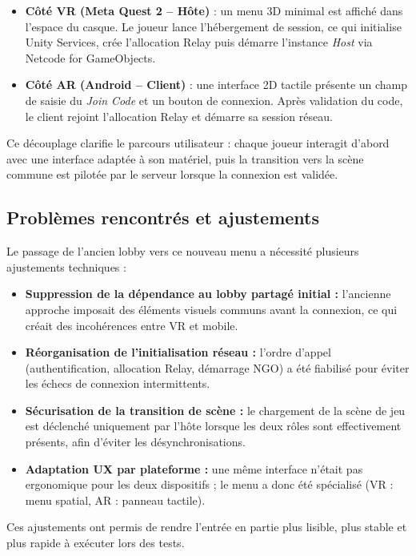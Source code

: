 \documentclass[12pt, a4paper]{article}
\begin{document}
\begin{itemize}
  \item \textbf{Côté VR (Meta Quest 2 -- Hôte)} : un menu 3D minimal est affiché dans l'espace du casque. Le joueur lance l'hébergement de session, ce qui initialise Unity Services, crée l'allocation Relay puis démarre l'instance \textit{Host} via Netcode for GameObjects.
  \item \textbf{Côté AR (Android -- Client)} : une interface 2D tactile présente un champ de saisie du \textit{Join Code} et un bouton de connexion. Après validation du code, le client rejoint l'allocation Relay et démarre sa session réseau.
\end{itemize}

Ce découplage clarifie le parcours utilisateur : chaque joueur interagit d'abord avec une interface adaptée à son matériel, puis la transition vers la scène commune est pilotée par le serveur lorsque la connexion est validée.

\subsection{Problèmes rencontrés et ajustements}

Le passage de l'ancien lobby vers ce nouveau menu a nécessité plusieurs ajustements techniques :

\begin{itemize}
  \item \textbf{Suppression de la dépendance au lobby partagé initial :} l'ancienne approche imposait des éléments visuels communs avant la connexion, ce qui créait des incohérences entre VR et mobile.
  \item \textbf{Réorganisation de l'initialisation réseau :} l'ordre d'appel (authentification, allocation Relay, démarrage NGO) a été fiabilisé pour éviter les échecs de connexion intermittents.
  \item \textbf{Sécurisation de la transition de scène :} le chargement de la scène de jeu est déclenché uniquement par l'hôte lorsque les deux rôles sont effectivement présents, afin d'éviter les désynchronisations.
  \item \textbf{Adaptation UX par plateforme :} une même interface n'était pas ergonomique pour les deux dispositifs ; le menu a donc été spécialisé (VR : menu spatial, AR : panneau tactile).
\end{itemize}

Ces ajustements ont permis de rendre l'entrée en partie plus lisible, plus stable et plus rapide à exécuter lors des tests.
\end{document}
